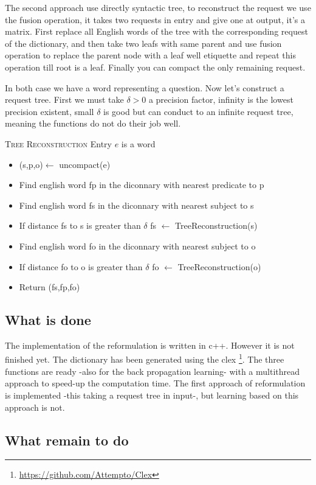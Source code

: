 The second approach use directly syntactic tree, to reconstruct the request we use the fusion operation, it takes two requests in entry and give one at output, it's a matrix. First replace all English words of the tree with the corresponding request of the dictionary, and then take two leafs with same parent and use fusion operation to replace the parent node with a leaf well etiquette and repeat this operation till root is a leaf. Finally you can compact the only remaining request. 

In both case we have a word representing a question. Now let's construct a request tree. First we must take $\delta>0$ a precision factor, infinity is the lowest precision existent, small $\delta$ is good but can conduct to an infinite request tree, meaning the functions do not do their job well.

\textsc{Tree Reconstruction}
Entry $e$ is a word

\begin{itemize}
\item (s,p,o)$\leftarrow$ uncompact(e)
\item Find english word fp in the diconnary with nearest predicate to p
\item Find english word fs in the diconnary with nearest subject to s
\item If distance fs to s is greater than $\delta$ fs $\leftarrow$ TreeReconstruction(s)
\item Find english word fo in the diconnary with nearest subject to o
\item If distance fo to o is greater than $\delta$ fo $\leftarrow$ TreeReconstruction(o)
\item Return (fs,fp,fo)
\end{itemize}


\subsection{What is done}

The implementation of the reformulation is written in c++. However it is not finished yet. The dictionary has been generated using the clex \footnote{\url{https://github.com/Attempto/Clex}}. The three functions are ready -also for the back propagation learning- with a multithread approach to speed-up the computation time. The first approach of reformulation is implemented -this taking a request tree in input-, but learning based on this approach is not.

\subsection{What remain to do}

